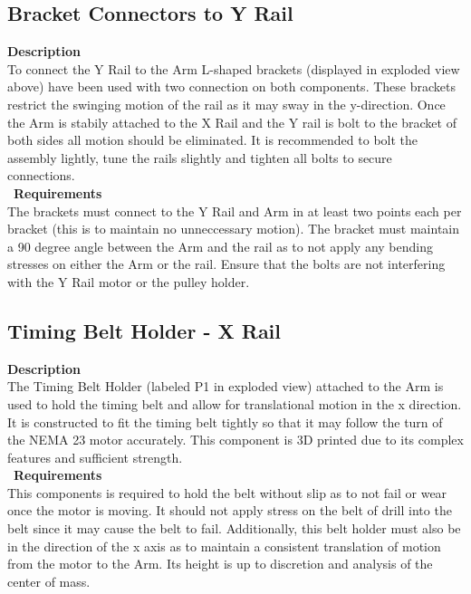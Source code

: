 \documentclass[titlepage]{article}
\begin{document}
\subsection{Bracket Connectors to Y Rail}
\textbf{Description}\\
To connect the Y Rail to the Arm L-shaped brackets (displayed in exploded view above) have been used with two connection on both components. These brackets restrict the swinging motion of the rail as it may sway in the y-direction. Once the Arm is stabily attached to the X Rail and the Y rail is bolt to the bracket of both sides all motion should be eliminated. It is recommended to bolt the assembly lightly, tune the rails slightly and tighten all bolts to secure connections.\\\
\textbf{Requirements}\\
The brackets must connect to the Y Rail and Arm in at least two points each per bracket (this is to maintain no unneccessary motion). The bracket must maintain a 90 degree angle between the Arm and the rail as to not apply any bending stresses on either the Arm or the rail. Ensure that the bolts are not interfering with the Y Rail motor or the pulley holder.



\subsection{Timing Belt Holder - X Rail}
\textbf{Description}\\
The Timing Belt Holder (labeled P1 in exploded view) attached to the Arm is used to hold the timing belt and allow for translational motion in the x direction. It is constructed to fit the timing belt tightly so that it may follow the turn of the NEMA 23 motor accurately. This component is 3D printed due to its complex features and sufficient strength.\\\
\textbf{Requirements}\\
This components is required to hold the belt without slip as to not fail or wear once the motor is moving. It should not apply stress on the belt of drill into the belt since it may cause the belt to fail. Additionally, this belt holder must also be in the direction of the x axis as to maintain a consistent translation of motion from the motor to the Arm. Its height is up to discretion and analysis of the center of mass.
\end{document}
